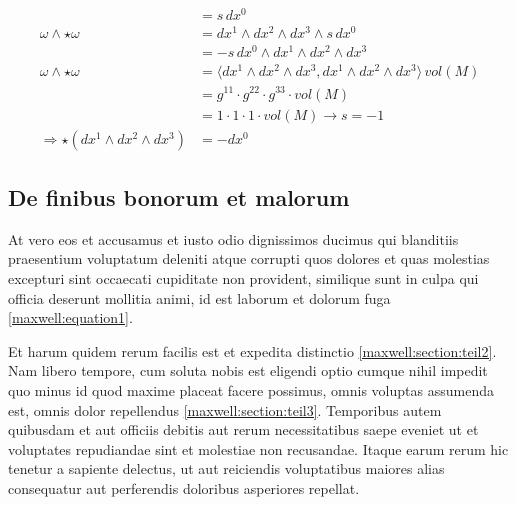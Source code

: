 \begin{align*}
	&=
	s \, dx^0
	\\
	\omega \wedge \star \omega 
	&=
	dx^1 \wedge dx^2 \wedge dx^3 \wedge s \, dx^0
	\\
	&=
	-s \, dx^0 \wedge dx^1 \wedge dx^2 \wedge dx^3
	\\
	\omega \wedge \star \omega
	&=
	\langle dx^1 \wedge dx^2 \wedge dx^3 , dx^1 \wedge dx^2 \wedge dx^3 \rangle \, vol(M)
	\\
	&=
	g^{11} \cdot g^{22} \cdot g^{33} \cdot vol(M)
	\\
	&=
	1 \cdot 1 \cdot 1 \cdot vol(M) \rightarrow s = -1
	\\
	\Rightarrow \star (dx^1 \wedge dx^2 \wedge dx^3) 
	&= - dx^0
\end{align*}





\subsection{De finibus bonorum et malorum
\label{maxwell:subsection:finibus}}
At vero eos et accusamus et iusto odio dignissimos ducimus qui
blanditiis praesentium voluptatum deleniti atque corrupti quos
dolores et quas molestias excepturi sint occaecati cupiditate non
provident, similique sunt in culpa qui officia deserunt mollitia
animi, id est laborum et dolorum fuga \eqref{maxwell:equation1}.

Et harum quidem rerum facilis est et expedita distinctio
\ref{maxwell:section:teil2}.
Nam libero tempore, cum soluta nobis est eligendi optio cumque nihil
impedit quo minus id quod maxime placeat facere possimus, omnis
voluptas assumenda est, omnis dolor repellendus
\ref{maxwell:section:teil3}.
Temporibus autem quibusdam et aut officiis debitis aut rerum
necessitatibus saepe eveniet ut et voluptates repudiandae sint et
molestiae non recusandae.
Itaque earum rerum hic tenetur a sapiente delectus, ut aut reiciendis
voluptatibus maiores alias consequatur aut perferendis doloribus
asperiores repellat.


